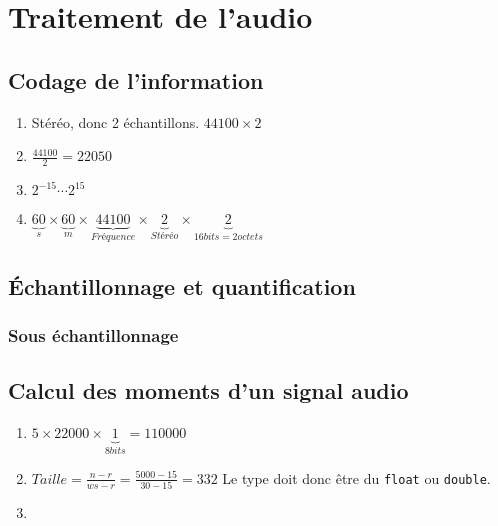 \documentclass[12pt,a4paper,openany]{book}
\begin{document}
	\thispagestyle{empty} %
	\titleBC 
	\setcounter{tocdepth}{2}
	\setcounter{secnumdepth}{3}
	\tableofcontents
	\chapter{Traitement de l'audio}
	\section{Codage de l'information}
	\begin{enumerate}
		\item Stéréo, donc 2 échantillons. $44100 \times 2$
		\item $\frac{44100}{2} = 22050$
		\item $2^{-15} \cdots 2^{15}$
		\item $\underbrace{60}_{s} \times \underbrace{60}_{m} \times
	\underbrace{44100}_{Fréquence} \times
	\underbrace{2}_{Stéréo} \times \underbrace{2}_{16 bits = 2
	octets}$
	\end{enumerate}

	\section{Échantillonnage et quantification}
	\subsection{Sous échantillonnage}
	
	\section{Calcul des moments d'un signal audio}
	\begin{enumerate}
		\item $5 \times 22000 \times \underbrace{1}_{8bits} = 110000$
		\item $Taille  = \frac{n-r}{ws - r} = \frac{5000 - 15}{30 - 15} = 332$ Le type doit donc être du \texttt{float} ou \texttt{double}.
		\item 
	
	\end{enumerate}
\end{document}
